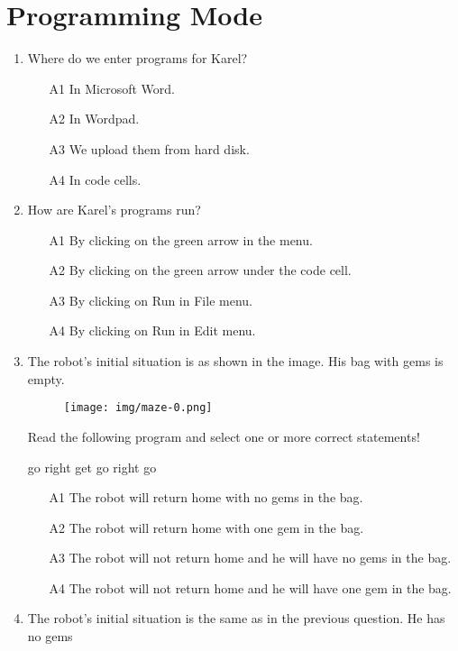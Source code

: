 
\section{Programming Mode}

\begin{enumerate}
\item Where do we enter programs for Karel?
\begin{enumerate}
\item[A1] In Microsoft Word.
\item[A2] In Wordpad.
\item[A3] We upload them from hard disk.
\item[A4] In code cells.
\end{enumerate}
\item How are Karel's programs run?
\begin{enumerate}
\item[A1] By clicking on the green arrow in the menu.
\item[A2] By clicking on the green arrow under the code cell.
\item[A3] By clicking on Run in File menu.
\item[A4] By clicking on Run in Edit menu.
\end{enumerate}
\item The robot's initial situation is as shown in the image. His bag with gems is empty.
\begin{figure}[!ht]
\begin{center}
\texttt{[image: img/maze-0.png]}
\end{center}
\end{figure}
\noindent
Read the following program and select one or more correct statements!
\begin{bluecode}
go
right
get
go
right 
go
\end{bluecode}
\begin{enumerate}
\item[A1] The robot will return home with no gems in the bag.
\item[A2] The robot will return home with one gem in the bag.
\item[A3] The robot will not return home and he will have no gems in the bag.
\item[A4] The robot will not return home and he will have one gem in the bag.
\end{enumerate}
\item The robot's initial situation is the same as in the previous question. He has no gems 

\end{enumerate}
